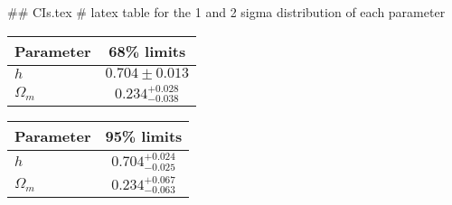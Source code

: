 ## CIs.tex
# latex table for the 1 and 2 sigma distribution of each parameter

\begin{tabular} { l  c}
 Parameter &  68\% limits\\
\hline
{\boldmath$h              $} & $0.704\pm 0.013            $\\
{\boldmath$\Omega_m       $} & $0.234^{+0.028}_{-0.038}   $\\
\hline
\end{tabular}

\begin{tabular} { l  c}
 Parameter &  95\% limits\\
\hline
{\boldmath$h              $} & $0.704^{+0.024}_{-0.025}   $\\
{\boldmath$\Omega_m       $} & $0.234^{+0.067}_{-0.063}   $\\
\hline
\end{tabular}
